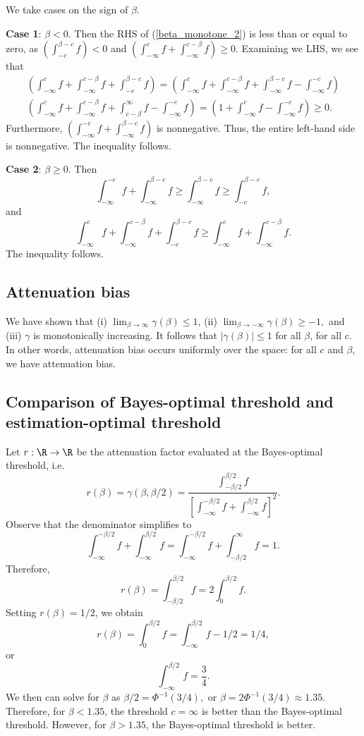 \documentclass[12pt]{article}
\begin{document}
We take cases on the sign of $\beta$.

\textbf{Case 1}: $\beta < 0$. Then the RHS of (\ref{beta_monotone_2}) is less than or equal to zero, as $\left(\int_{-c}^{\beta-c} f\right) < 0$ and $\left( \int_{-\infty}^c f + \int_{-\infty}^{c-\beta}f \right) \geq 0$. Examining we LHS, we see that
\begin{multline*}
 \left( \int_{-\infty}^c f + \int_{-\infty}^{c -\beta} f + \int_{-c}^{\beta-c} f \right) = \left( \int_{-\infty}^c f + \int_{-\infty}^{c - \beta} f + \int_{-\infty}^{\beta - c} f - \int_{-\infty}^{-c} f \right) \\ \left( \int_{-\infty}^c f + \int_{-\infty}^{c - \beta} f + \int_{c - \beta}^{\infty} f - \int_{-\infty}^{-c} f \right) = \left( 1 + \int_{-\infty}^c f - \int_{-\infty}^{-c} f \right) \geq 0.
 \end{multline*}
 Furthermore, $\left( \int_{-\infty}^{-c} f + \int_{-\infty}^{\beta - c} f \right)$ is nonnegative. Thus, the entire left-hand side is nonnegative. The inequality follows.
 
 \textbf{Case 2}: $\beta \geq 0$. Then
 $$ \int_{-\infty}^{-c} f + \int_{-\infty}^{\beta -c } f \geq \int_{-\infty}^{\beta -c } f \geq \int_{-c}^{\beta - c}  f,$$ and $$ \int_{-\infty}^c f + \int_{-\infty}^{c - \beta} f + \int_{-c}^{\beta - c} f \geq \int_{-\infty}^c f + \int_{-\infty}^{c - \beta} f .$$ The inequality follows.

\subsection{Attenuation bias}

We have shown that (i) $\lim_{\beta \to \infty} \gamma(\beta) \leq 1$, (ii) $\lim_{\beta \to -\infty} \gamma(\beta) \geq -1,$ and (iii) $\gamma$ is monotonically increasing. It follows that $|\gamma(\beta)| \leq 1$ for all $\beta$, for all $c$. In other words, attenuation bias occurs uniformly over the space: for all $c$ and $\beta$, we have attenuation bias.

\subsection{Comparison of Bayes-optimal threshold and estimation-optimal threshold}

Let $r: \R \to \R$ be the attenuation factor evaluated at the Bayes-optimal threshold, i.e.
$$ r(\beta) = \gamma(\beta, \beta/2) = \frac{ \int_{-\beta/2}^{\beta/2} f }{ \left[ \int_{-\infty}^{-\beta/2} f + \int_{-\infty}^{\beta/2} f \right]^2 }.$$ Observe that the denominator simplifies to
$$ \int_{-\infty}^{-\beta/2} f + \int_{-\infty}^{\beta/2} f = \int_{-\infty}^{-\beta/2} f + \int_{-\beta/2}^{\infty} f = 1.$$ Therefore,
$$r(\beta) = \int_{-\beta/2}^{\beta/2} f = 2 \int_{0}^{\beta/2} f.$$ Setting $r(\beta) = 1/2$, we obtain
$$r(\beta) =\int_0^{\beta/2} f = \int_{-\infty}^{\beta/2} f - 1/2  = 1/4,$$ or 
$$\int_{-\infty}^{\beta/2} f = \frac{3}{4}.$$ We then can solve for $\beta$ as $\beta/2 = \Phi^{-1}(3/4),$ or $\beta = 2 \Phi^{-1}(3/4) \approx 1.35.$ Therefore, for $\beta < 1.35$, the threshold $c = \infty$ is better than the Bayes-optimal threshold. However, for $\beta > 1.35$, the Bayes-optimal threshold is better.
\end{document}
